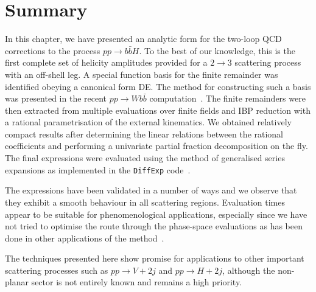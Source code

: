 \documentclass[main.tex]{subfiles}
\begin{document}
\section{Summary}
\label{Hbbsec:conclusions}

In this chapter, we have presented an analytic form for the two-loop QCD corrections to the process
$pp\to b\bar{b}H$. To the best of our knowledge, this is the first complete set of helicity
amplitudes provided for a $2\to 3$ scattering process with an off-shell leg. A special function basis for
the finite remainder was identified obeying a canonical form DE. The method for
constructing such a basis was presented in the recent $pp\to Wb\bar{b}$ computation~\cite{Badger:2021nhg}. The finite remainders were then extracted from multiple
evaluations over finite fields and IBP reduction with a rational parametrisation of the external kinematics.
We obtained relatively compact results after determining the linear relations between the rational coefficients and
performing a univariate partial fraction decomposition on the fly. The final expressions were evaluated using the method of generalised series expansions as implemented in the \texttt{DiffExp} code~\cite{Hidding:2020ytt}.

The expressions have been validated in a number of ways and we observe that they exhibit a smooth behaviour in all
scattering regions. Evaluation times appear to be suitable for phenomenological applications,
especially since we have not tried to optimise the route through the phase-space evaluations as has
been done in other applications of the method~\cite{Frellesvig:2019byn,Abreu:2020jxa,Becchetti:2020wof,Bonciani:2021zzf,abreu2021twoloop}.

The techniques presented here show promise for applications to other important scattering processes such
as $pp\to V+2j$ and $pp\to H+2j$, although the non-planar sector is not entirely known and remains a high priority.
\end{document}
